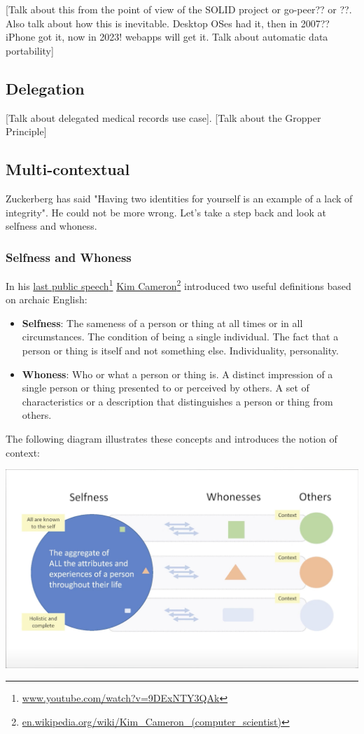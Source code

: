 \documentclass[11pt, oneside]{article}   	%
\newcommand{\hyperfootnote}[1][]{\def\ArgI{{#1}}\hyperfootnoteRelay}
\newcommand\hyperfootnoteRelay[2][]{\href{#1#2}{\ArgI}\footnote{\href{#1#2}{#2}}}
\begin{document}
[Talk about this from the point of view of the SOLID project or go-peer?? or ??. Also talk about how this is inevitable. Desktop OSes had it, then in 2007?? iPhone got it, now in 2023! webapps will get it. Talk about automatic data portability]

\subsection{Delegation}

[Talk about delegated medical records use case]. [Talk about the Gropper Principle]

\subsection{Multi-contextual}

Zuckerberg has said "Having two identities for yourself is an example of a lack of integrity"\cite{Kirkpatrick2011}. He could not be more wrong. Let's take a step back and look at selfness and whoness. 

\subsubsection{Selfness and Whoness}

In his \hyperfootnote[last public speech][https://]{www.youtube.com/watch?v=9DExNTY3QAk}  
\hyperfootnote[Kim Cameron][https://]{en.wikipedia.org/wiki/Kim\_Cameron\_(computer\_scientist)} introduced two useful definitions based on archaic English:

\begin{itemize}
\item \textbf{Selfness}: The sameness of a person or thing at all times or in all circumstances. The condition of being a single individual. The fact that a person or thing is itself and not something else. Individuality, personality. 
\item \textbf{Whoness}: Who or what a person or thing is. A distinct impression of a single person or thing presented to or perceived by others. A set of characteristics or a description that distinguishes a person or thing from others. 
\end{itemize}

The following diagram illustrates these concepts and introduces the notion of context:

\includegraphics[width=\textwidth]{./images/selfness-and-whoness-larger.png}
\end{document}
